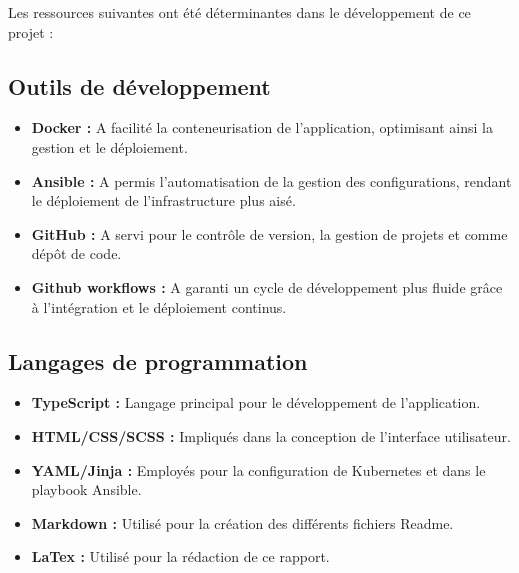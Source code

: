 Les ressources suivantes ont été déterminantes dans le développement de ce projet :

\subsection{Outils de développement}\label{subsec:outils-de-developpement}
\begin{itemize}
    \item \textbf{Docker :} A facilité la conteneurisation de l'application, optimisant ainsi la gestion et le déploiement.
    \item \textbf{Ansible :} A permis l'automatisation de la gestion des configurations, rendant le déploiement de l'infrastructure plus aisé.
    \item \textbf{GitHub :} A servi pour le contrôle de version, la gestion de projets et comme dépôt de code.
    \item \textbf{Github workflows :} A garanti un cycle de développement plus fluide grâce à l'intégration et le déploiement continus.
\end{itemize}

\subsection{Langages de programmation}\label{subsec:langages-de-programmation}
\begin{itemize}
    \item \textbf{TypeScript :} Langage principal pour le développement de l'application.
    \item \textbf{HTML/CSS/SCSS :} Impliqués dans la conception de l'interface utilisateur.
    \item \textbf{YAML/Jinja :} Employés pour la configuration de Kubernetes et dans le playbook Ansible.
    \item \textbf{Markdown :} Utilisé pour la création des différents fichiers Readme.
    \item \textbf{LaTex :} Utilisé pour la rédaction de ce rapport.
\end{itemize}

